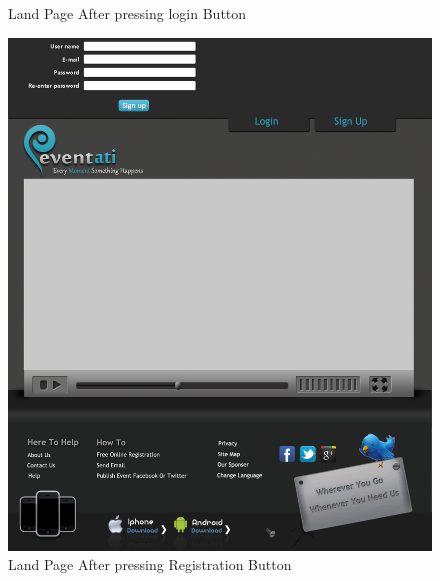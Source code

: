 \documentclass[12pt,a4paper,class,twoside,openany]{report}
\begin{document}
{\begin{figure}
\begin{center}
\caption{Land Page After pressing login Button}
\label{fg:8-17}
\end{center}
\end{figure}
\begin{figure}
\begin{center}
\includegraphics[height=6 in]{8-18}
\caption{Land Page After pressing Registration Button}
\label{fg:8-18}
\end{center}
\end{figure}

}
\end{document}

